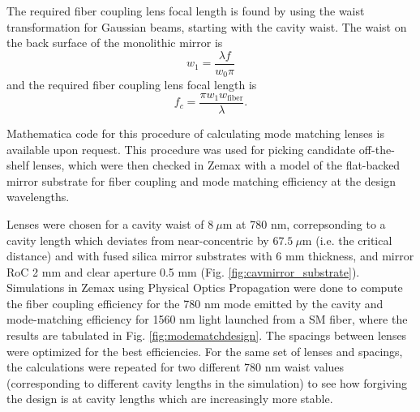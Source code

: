 The required fiber coupling lens focal length is found by using the waist transformation for Gaussian beams, starting with the cavity waist. The waist on the back surface of the monolithic mirror is
\begin{equation}
    w_1 = \frac{\lambda f}{w_0 \pi}
\end{equation}
and the required fiber coupling lens focal length is
\begin{equation}
    f_c = \frac{\pi w_1 w_{\textrm{fiber}}}{\lambda}.
\end{equation}

Mathematica code for this procedure of calculating mode matching lenses is available upon request. This procedure was used for picking candidate off-the-shelf lenses, which were then checked in Zemax with a model of the flat-backed mirror substrate for fiber coupling and mode matching efficiency at the design wavelengths. 

Lenses were chosen for a cavity waist of $8~\mu $m at 780 nm, correpsonding to a cavity length which deviates from near-concentric by $67.5~\mu \mathrm{m}$ (i.e. the critical distance) and with fused silica mirror substrates with 6 mm thickness, and mirror RoC 2 mm and clear aperture 0.5 mm (Fig. \ref{fig:cavmirror_substrate}). Simulations in Zemax using Physical Optics Propagation were done to compute the fiber coupling efficiency for the 780 nm mode emitted by the cavity and mode-matching efficiency for 1560 nm light launched from a SM fiber, where the results are tabulated in Fig. \ref{fig:modematchdesign}. The spacings between lenses were optimized for the best efficiencies. For the same set of lenses and spacings, the calculations were repeated for two different 780 nm waist values (corresponding to different cavity lengths in the simulation) to see how forgiving the design is at cavity lengths which are increasingly more stable.


